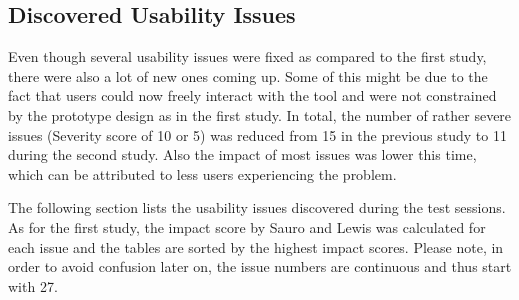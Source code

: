 

\subsection{Discovered Usability Issues}
Even though several usability issues were fixed as compared to the first study, there were also a lot of new ones coming up. Some of this might be due to the fact that users could now freely interact with the tool and were not constrained by the prototype design as in the first study. In total, the number of rather severe issues (Severity score of 10 or 5)  was reduced from 15 in the previous study to 11 during the second study. Also the impact of most issues was lower this time, which can be attributed to less users experiencing the problem.

The following section lists the usability issues discovered during the test sessions. As for the first study, the impact score by Sauro and Lewis \cite{sauro_quantifying_2012} was calculated for each issue and the tables are sorted by the highest impact scores. Please note, in order to avoid confusion later on, the issue numbers are continuous and thus start with 27.


